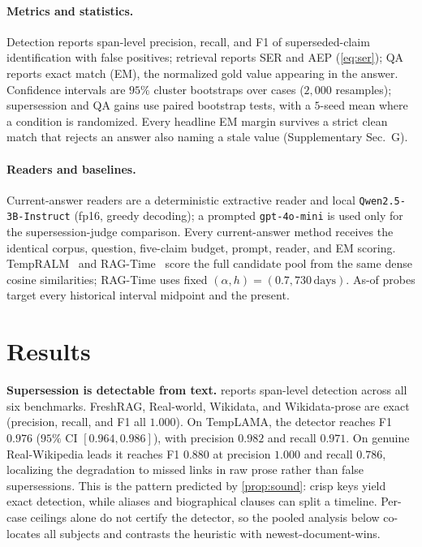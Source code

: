 \documentclass[letterpaper]{article}
\theoremstyle{plain}
\begin{document}
\paragraph{Metrics and statistics.} Detection reports span-level precision, recall, and F1 of superseded-claim identification with false positives; retrieval reports SER and AEP (\cref{eq:ser}); QA reports exact match (EM), the normalized gold value appearing in the answer. Confidence intervals are $95\%$ cluster bootstraps over cases ($2{,}000$ resamples); supersession and QA gains use paired bootstrap tests, with a $5$-seed mean where a condition is randomized. Every headline EM margin survives a strict clean match that rejects an answer also naming a stale value (Supplementary Sec.~G).

\paragraph{Readers and baselines.} Current-answer readers are a deterministic extractive reader and local \texttt{Qwen2.5-3B-Instruct} (fp16, greedy decoding); a prompted \texttt{gpt-4o-mini} is used only for the supersession-judge comparison. Every current-answer method receives the identical corpus, question, five-claim budget, prompt, reader, and EM scoring. TempRALM~\citep{gade2024tempralm} and RAG-Time~\citep{grofsky2025ragtime} score the full candidate pool from the same dense cosine similarities; RAG-Time uses fixed $(\alpha,h){=}(0.7,730\,\mathrm{days})$. As-of probes target every historical interval midpoint and the present.

\section{Results}
\label{sec:results}

\noindent\textbf{Supersession is detectable from text.}  reports span-level detection across all six benchmarks. FreshRAG, Real-world, Wikidata, and Wikidata-prose are exact (precision, recall, and F1 all $1.000$). On TempLAMA, the detector reaches F1 $0.976$ ($95\%$ CI $[0.964,0.986]$), with precision $0.982$ and recall $0.971$. On genuine Real-Wikipedia leads it reaches F1 $0.880$ at precision $1.000$ and recall $0.786$, localizing the degradation to missed links in raw prose rather than false supersessions. This is the pattern predicted by \cref{prop:sound}: crisp keys yield exact detection, while aliases and biographical clauses can split a timeline. Per-case ceilings alone do not certify the detector, so the pooled analysis below co-locates all subjects and contrasts the heuristic with newest-document-wins.
\end{document}
